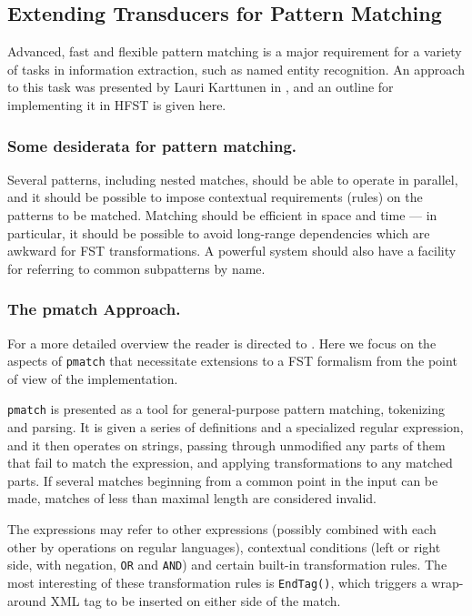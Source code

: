 \documentclass[draft]{llncs}
\begin{document}
\subsection{Extending Transducers for Pattern Matching}

Advanced, fast and flexible pattern matching is a major requirement for a
variety of tasks in information extraction, such as named entity recognition.
An approach to this task was presented by Lauri Karttunen in
\cite{karttunen/2011}, and an outline for implementing it in HFST is given here.

\subsubsection{Some desiderata for pattern matching.} Several patterns,
including nested matches, should be able to operate in parallel, and
it should be possible to impose contextual requirements (rules) on
the patterns to be matched. Matching should be efficient in space and
time --- in particular, it should be possible to avoid long-range
dependencies which are awkward for FST transformations.
A powerful system should also have a facility for referring
to common subpatterns by name.

\subsubsection{The pmatch Approach.}

For a more detailed overview the reader is directed to \cite{karttunen/2011}.
Here we focus on the aspects of \verb!pmatch! that necessitate extensions
to a FST formalism from the point of view of the implementation.

\verb!pmatch! is presented as a tool for general-purpose pattern matching,
tokenizing and parsing. It is given a series of definitions and a
specialized regular expression, and it then operates on strings, passing
through unmodified any parts of them that fail to match the expression,
and applying transformations to any matched parts. If several matches beginning
from a common point in the input can be made, matches of less than maximal
length are considered invalid.

The expressions may refer to other expressions (possibly combined with each
other by operations on regular languages), contextual conditions
(left or right side, with negation, \verb!OR! and \verb!AND!) and certain
built-in transformation rules. The most interesting of these transformation
rules is \verb!EndTag()!, which triggers a wrap-around XML tag to be inserted
on either side of the match.
\end{document}
